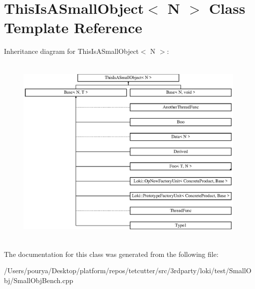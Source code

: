 \hypertarget{classThisIsASmallObject}{}\section{This\+Is\+A\+Small\+Object$<$ N $>$ Class Template Reference}
\label{classThisIsASmallObject}
Inheritance diagram for This\+Is\+A\+Small\+Object$<$ N $>$\+:\begin{figure}[H]
\begin{center}
\leavevmode
\includegraphics[height=9.476923cm]{classThisIsASmallObject}
\end{center}
\end{figure}


The documentation for this class was generated from the following file\+:\begin{DoxyCompactItemize}
\item 
/\+Users/pourya/\+Desktop/platform/repos/tetcutter/src/3rdparty/loki/test/\+Small\+Obj/Small\+Obj\+Bench.\+cpp\end{DoxyCompactItemize}

